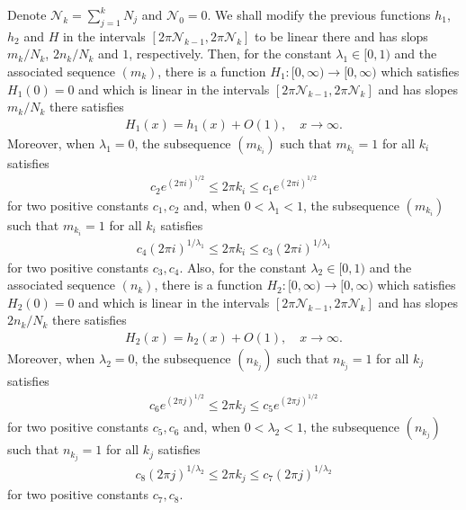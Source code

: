 \documentclass[12pt]{amsart}
\numberwithin{equation}{section}
\begin{document}
Denote $\mathcal{N}_k=\sum_{j=1}^{k}N_j$ and $\mathcal{N}_0=0$. We shall modify the previous functions $h_1$, $h_2$ and $H$ in the intervals $[2\pi \mathcal{N}_{k-1},2\pi \mathcal{N}_k]$ to be linear there and has slops $m_{k}/N_{k}$, $2n_{k}/N_{k}$ and $1$, respectively. Then, for the constant $\lambda_1\in[0,1)$ and the associated sequence $(m_k)$, there is a function $H_1:[0,\infty)\to[0,\infty)$ which satisfies $H_1(0)=0$ and which is linear in the intervals $[2\pi \mathcal{N}_{k-1},2\pi\mathcal{N}_k]$ and has slopes $m_k/N_k$ there satisfies
\begin{equation*}%
\begin{split}
H_1(x)=h_1(x)+O(1),  \quad x\to\infty.
\end{split}
\end{equation*}
Moreover, when $\lambda_1=0$, the subsequence $(m_{k_i})$ such that $m_{k_i}=1$ for all $k_i$ satisfies
\begin{equation}\label{recuree3-a3-a3}
\begin{split}
c_{2}e^{(2\pi i)^{1/2}}\leq 2\pi k_{i}\leq c_{1}e^{(2\pi i)^{1/2}}
\end{split}
\end{equation}
for two positive constants $c_{1},c_{2}$ and, when $0<\lambda_1<1$, the subsequence $(m_{k_i})$ such that $m_{k_i}=1$ for all $k_i$ satisfies
\begin{equation}\label{recuree4-a4-a4}
\begin{split}
c_{4}(2\pi i)^{1/\lambda_1}\leq 2\pi k_{i}\leq c_{3}(2\pi i)^{1/\lambda_1}
\end{split}
\end{equation}
for two positive constants $c_{3},c_{4}$. Also, for the constant $\lambda_2\in[0,1)$ and the associated sequence $(n_k)$, there is a function $H_2:[0,\infty)\to[0,\infty)$ which satisfies $H_2(0)=0$ and which is linear in the intervals $[2\pi \mathcal{N}_{k-1},2\pi\mathcal{N}_k]$ and has slopes $2n_k/N_k$ there satisfies
\begin{equation*}%
\begin{split}
H_2(x)=h_2(x)+O(1),  \quad x\to\infty.
\end{split}
\end{equation*}
Moreover, when $\lambda_2=0$, the subsequence $(n_{k_j})$ such that $n_{k_j}=1$ for all $k_j$ satisfies
\begin{equation}\label{recuree3-b3-b3}
\begin{split}
c_{6}e^{(2\pi j)^{1/2}}\leq 2\pi k_{j}\leq c_{5}e^{(2\pi j)^{1/2}}
\end{split}
\end{equation}
for two positive constants $c_{5},c_{6}$ and, when $0<\lambda_2<1$, the subsequence $(n_{k_j})$ such that $n_{k_j}=1$ for all $k_j$ satisfies
\begin{equation}\label{recuree4-b4-b4}
\begin{split}
c_{8}(2\pi j)^{1/\lambda_2}\leq 2\pi k_{j}\leq c_{7}(2\pi j)^{1/\lambda_2}
\end{split}
\end{equation}
for two positive constants $c_{7},c_{8}$.
\end{document}
